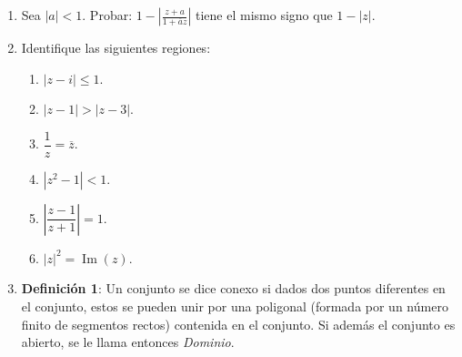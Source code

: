 \documentclass[11pt]{article}
\begin{document}
\begin{enumerate}
\begin{proof}
   Note que el último término de la derecha  de puede escribir como

   $$\Re\left(exp(in\theta/2)\frac{\sin\left((n+1)\theta/2\right)}{\sin(\theta/2)}\right)=\cos(n\theta/2)\frac{\sin((n+1)\theta/2)}{\sin(\theta/2)},$$

   además
   
   $$
\begin{aligned}
\cos \left(\frac{n \theta}{2}\right) \sin \left(\frac{(n+1) \theta}{2}\right)&=\frac{1}{2}\left(\sin \left(\frac{\theta n}{2}+\frac{\theta(n+1)}{2}\right)+\sin \left(\frac{\theta(n+1)}{2}-\frac{n \theta}{2}\right)\right. \\
& =\frac{1}{2}\left(\sin \left(\frac{\theta(2 n+1)}{2}\right)+\sin \left(\frac{\theta}{2}\right)\right) \\
& =\frac{1}{2} \sin \left(\theta\left(1+\frac{1}{2}\right)\right)+\frac{1}{2} \sin \left(\frac{\theta}{2}\right),
\end{aligned}
$$
dividiendo entre $\sin\left(\displaystyle\frac{\theta}{2}\right)$ fecho.

    \end{proof}

    \item Sea $|a| < 1$. Probar: $1 - \left| \frac{z + a}{1 + \overline{a}z} \right|$ tiene el mismo signo que $1 - |z|$.

    \item Identifique las siguientes regiones:
    \begin{enumerate}
        \item $|z - i| \leq 1$.
        \item $|z - 1| > |z - 3|$.
        \item $\dfrac{1}{z} = \overline{z}$.
        \item $|z^2 - 1| < 1$.
        \item $\left| \dfrac{z - 1}{z + 1} \right| = 1$.
        \item $|z|^2 = \operatorname{Im}(z)$.
    \end{enumerate}

    \item \textbf{Definición 1}: Un conjunto se dice conexo si dados dos puntos diferentes en el conjunto, estos se pueden unir por una poligonal (formada por un número finito de segmentos rectos) contenida en el conjunto. Si además el conjunto es abierto, se le llama entonces \textit{Dominio}.


\end{enumerate}
\end{document}
